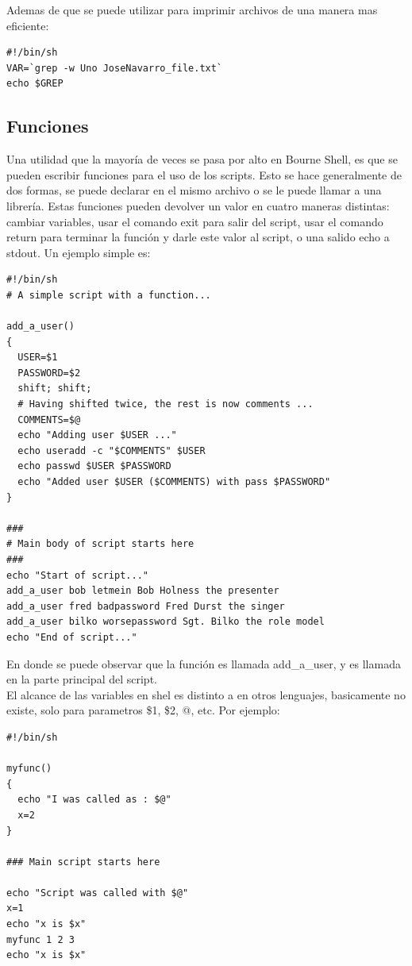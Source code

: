 \documentclass[12pt]{article}
\begin{document}
Ademas de que se puede utilizar para imprimir archivos de una manera mas eficiente:
\begin{verbatim}
#!/bin/sh
VAR=`grep -w Uno JoseNavarro_file.txt`
echo $GREP
\end{verbatim}

\subsection{Funciones}
Una utilidad que la mayoría de veces se pasa por alto en Bourne Shell, es que se pueden escribir funciones para el uso de los scripts. Esto se hace generalmente de dos formas, se puede declarar en el mismo archivo o se le puede llamar a una librería. Estas funciones pueden devolver un valor en cuatro maneras distintas: cambiar variables, usar el comando exit para salir del script, usar el comando return para terminar la función y darle este valor al script, o una salido echo a stdout. Un ejemplo simple es:\\

\begin{verbatim}
#!/bin/sh
# A simple script with a function...

add_a_user()
{
  USER=$1
  PASSWORD=$2
  shift; shift;
  # Having shifted twice, the rest is now comments ...
  COMMENTS=$@
  echo "Adding user $USER ..."
  echo useradd -c "$COMMENTS" $USER
  echo passwd $USER $PASSWORD
  echo "Added user $USER ($COMMENTS) with pass $PASSWORD"
}

###
# Main body of script starts here
###
echo "Start of script..."
add_a_user bob letmein Bob Holness the presenter
add_a_user fred badpassword Fred Durst the singer
add_a_user bilko worsepassword Sgt. Bilko the role model
echo "End of script..."
\end{verbatim}

En donde se puede observar que la función es llamada add\_a\_user, y es llamada en la parte principal del script. \\

El alcance de las variables en shel es distinto a en otros lenguajes, basicamente no existe, solo para parametros \$1, \$2, @, etc. Por ejemplo:

\begin{verbatim}
#!/bin/sh

myfunc()
{
  echo "I was called as : $@"
  x=2
}

### Main script starts here 

echo "Script was called with $@"
x=1
echo "x is $x"
myfunc 1 2 3
echo "x is $x"
\end{verbatim}
\end{document}
